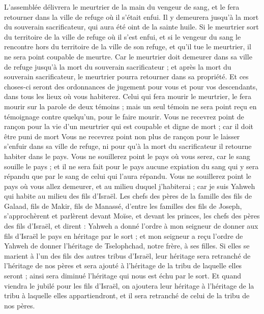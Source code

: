 \begin{multicols}{2}
L'assemblée délivrera le meurtrier de la main du vengeur de sang, et le fera retourner dans la ville de refuge où il s'était enfui. Il y demeurera jusqu'à la mort du souverain sacrificateur, qui aura été oint de la sainte huile.
Si le meurtrier sort du territoire de la ville de refuge où il s'est enfui,
et si le vengeur du sang le rencontre hors du territoire de la ville de son refuge, et qu'il tue le meurtrier, il ne sera point coupable de meurtre.
Car le meurtrier doit demeurer dans sa ville de refuge jusqu'à la mort du souverain sacrificateur ; et après la mort du souverain sacrificateur, le meurtrier pourra retourner dans sa propriété.
Et ces choses-ci seront des ordonnances de jugement pour vous et pour vos descendants, dans tous les lieux où vous habiterez.
Celui qui fera mourir le meurtrier, le fera mourir sur la parole de deux témoins ; mais un seul témoin ne sera point reçu en témoignage contre quelqu'un, pour le faire mourir.
Vous ne recevrez point de rançon pour la vie d'un meurtrier qui est coupable et digne de mort ; car il doit être puni de mort
Vous ne recevrez point non plus de rançon pour le laisser s’enfuir dans sa ville de refuge, ni pour qu'à la mort du sacrificateur il retourne habiter dans le pays.
Vous ne souillerez point le pays où vous serez, car le sang souille le pays ; et il ne sera fait pour le pays aucune expiation du sang qui y sera répandu que par le sang de celui qui l'aura répandu.
Vous ne souillerez point le pays où vous allez demeurer, et au milieu duquel j'habiterai ; car je suis Yahweh qui habite au milieu des fils d'Israël.
\VerseOne{}Les chefs des pères de la famille des fils de Galaad, fils de Makir, fils de Manassé, d'entre les familles des fils de Joseph, s'approchèrent et parlèrent devant Moïse, et devant les princes, les chefs des pères des fils d'Israël,
et dirent : Yahweh a donné l’ordre à mon seigneur de donner aux fils d'Israël le pays en héritage par le sort ; et mon seigneur a reçu l'ordre de Yahweh de donner l'héritage de Tselophchad, notre frère, à ses filles.
Si elles se marient à l'un des fils des autres tribus d'Israël, leur héritage sera retranché de l'héritage de nos pères et sera ajouté à l’héritage de la tribu de laquelle elles seront ; ainsi sera diminué l'héritage qui nous est échu par le sort.
Et quand viendra le jubilé pour les fils d'Israël, on ajoutera leur héritage à l'héritage de la tribu à laquelle elles appartiendront, et il sera retranché de celui de la tribu de nos pères.

\end{multicols}
